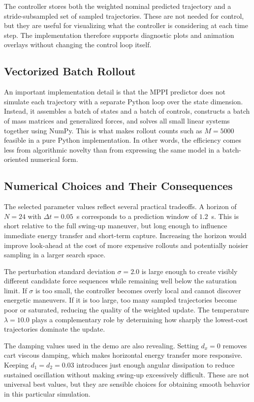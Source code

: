 \documentclass[conference]{IEEEtran}
\begin{document}
The controller stores both the weighted nominal predicted trajectory and a stride-subsampled set of sampled trajectories. These are not needed for control, but they are useful for visualizing what the controller is considering at each time step. The implementation therefore supports diagnostic plots and animation overlays without changing the control loop itself.

\subsection{Vectorized Batch Rollout}
An important implementation detail is that the MPPI predictor does not simulate each trajectory with a separate Python loop over the state dimension. Instead, it assembles a batch of states and a batch of controls, constructs a batch of mass matrices and generalized forces, and solves all small linear systems together using NumPy. This is what makes rollout counts such as $M=5000$ feasible in a pure Python implementation. In other words, the efficiency comes less from algorithmic novelty than from expressing the same model in a batch-oriented numerical form.

\subsection{Numerical Choices and Their Consequences}
The selected parameter values reflect several practical tradeoffs. A horizon of $N=24$ with $\Delta t=0.05$~s corresponds to a prediction window of $1.2$~s. This is short relative to the full swing-up maneuver, but long enough to influence immediate energy transfer and short-term capture. Increasing the horizon would improve look-ahead at the cost of more expensive rollouts and potentially noisier sampling in a larger search space.

The perturbation standard deviation $\sigma=2.0$ is large enough to create visibly different candidate force sequences while remaining well below the saturation limit. If $\sigma$ is too small, the controller becomes overly local and cannot discover energetic maneuvers. If it is too large, too many sampled trajectories become poor or saturated, reducing the quality of the weighted update. The temperature $\lambda=10.0$ plays a complementary role by determining how sharply the lowest-cost trajectories dominate the update.

The damping values used in the demo are also revealing. Setting $d_x=0$ removes cart viscous damping, which makes horizontal energy transfer more responsive. Keeping $d_1=d_2=0.03$ introduces just enough angular dissipation to reduce sustained oscillation without making swing-up excessively difficult. These are not universal best values, but they are sensible choices for obtaining smooth behavior in this particular simulation.
\end{document}
